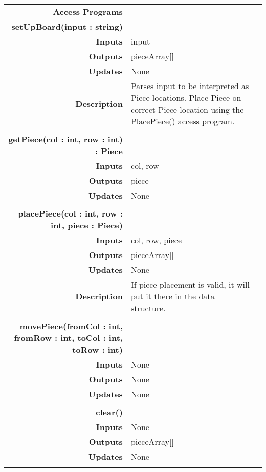 \documentclass[10pt]{article}
\begin{document}
\begin{tabularx}{\linewidth}{ >{\bfseries}r Xp{5cm} }
            Access Programs & \begin{tabular}[t]{@{} p{4cm} p{7cm}} 
                                     & \\
                                    \bf{setUpBoard(input : string)} & \\
                                    Inputs & input \\
                                    Outputs & pieceArray[] \\
                                    Updates & None \\
                                    Description & Parses input to be interpreted as Piece locations. Place Piece on correct Piece location using the PlacePiece() access program.\\
                                     & \\
                                    \bf{getPiece(col : int, row : int)} : Piece & \\
                                    Inputs & col, row \\
                                    Outputs & piece \\
                                    Updates & None \\ 
                                     & \\
                                    \bf{placePiece(col : int, row : int, piece : Piece)} & \\
                                    Inputs &  col, row, piece \\
                                    Outputs & pieceArray[] \\
                                    Updates & None \\ 
                                    Description & If piece placement is valid, it will put it there in the data structure. \\
                                     & \\
                                    \bf{movePiece(fromCol : int, fromRow : int, toCol : int, toRow : int)} & \\
                                    Inputs  & None \\
                                    Outputs & None \\
                                    Updates & None \\
                                     & \\
                                    \bf{clear()} & \\
                                    Inputs  & None \\
                                    Outputs & pieceArray[] \\
                                    Updates & None \\                                     
                              \end{tabular} \\
                              
        \end{tabularx}
\end{document}
